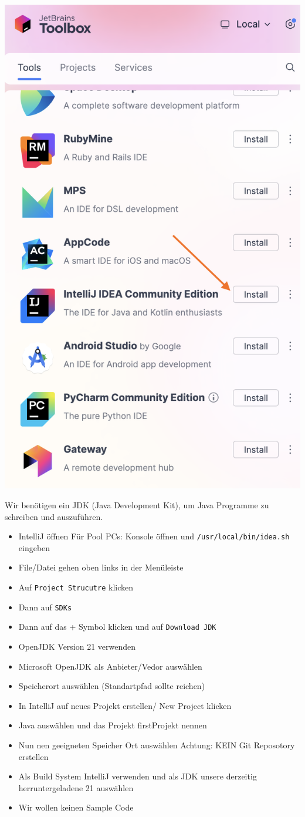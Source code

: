\documentclass{../../sheet}
\begin{document}
\includegraphics[width=0.5\linewidth]{../img/IntelliJDownload.png}

\newpage

Wir benötigen ein JDK (Java Development Kit), um Java Programme zu schreiben und
auszuführen.
\begin{itemize}
  \item IntelliJ öffnen \newline \achtung{} Für Pool PCs: Konsole öffnen und \texttt{/usr/local/bin/idea.sh} eingeben
  \item File/Datei gehen oben links in der Menüleiste
  \item Auf \texttt{Project Strucutre} klicken
  \item Dann auf \texttt{SDKs}
  \item Dann auf das + Symbol klicken und auf \texttt{Download JDK}
  \item OpenJDK Version 21 verwenden
  \item Microsoft OpenJDK als Anbieter/Vedor auswählen
  \item Speicherort auswählen (Standartpfad sollte reichen)
\end{itemize}

\newpage

\begin{itemize}
  \item In IntelliJ auf neues Projekt erstellen/ New Project klicken
  \item Java auswählen und das Projekt firstProjekt nennen
  \item Nun nen geeigneten Speicher Ort auswählen Achtung: KEIN Git Reposotory erstellen
  \item Als Build System IntelliJ verwenden und als JDK unsere derzeitig herruntergeladene 21 auswählen
  \item Wir wollen keinen Sample Code
\end{itemize}
\end{document}
